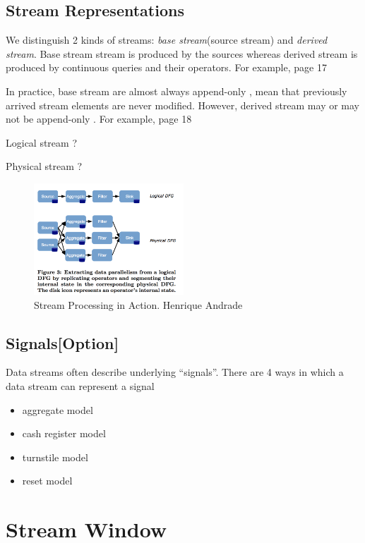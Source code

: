 \subsection*{Stream Representations}
We distinguish 2 kinds of streams: \textit{base stream}(source stream) and \textit{derived stream}. Base stream stream is produced by the sources whereas derived stream is produced by continuous queries and their operators\citep{Arasu:2006:CCQ}. For example, \citep{Golab:2010} page 17


In practice, base stream are almost always append-only , mean that previously arrived stream elements are never modified. However, derived stream may or may not be append-only . For example, \cite{Golab:2010}{page 18}

Logical stream ?  \citep{Kramer:2009}

Physical stream ?  \citep{Kramer:2009}



\begin{figure}[htbp!] 
\centering    
\includegraphics[width=0.5\textwidth]{logicalPhysicalDataFlow}
\caption[Minion]{Stream Processing in Action. Henrique Andrade}
\label{fig:streamRepresent}
\end{figure}

   
\subsection*{Signals[Option]}    \citep{Golab:2010} 
Data streams often describe underlying “signals”. There are 4 ways in which a data stream can represent a signal
\begin{itemize}
	\item	aggregate model
    \item	cash register model
    \item 	turnstile model
    \item	reset model
\end{itemize}
    
    
\section{Stream Window}

